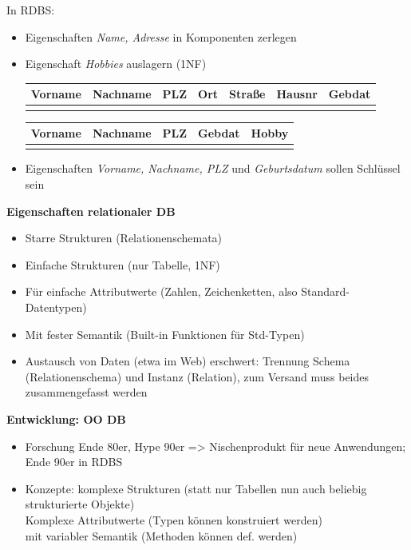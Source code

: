 In RDBS:
\begin{itemize}
	\item Eigenschaften \textit{Name, Adresse} in Komponenten zerlegen
	\item Eigenschaft \textit{Hobbies} auslagern (1NF)
	\begin{table}[!h]
		\centering
		\begin{tabular}{|l|l|l|l|l|l|l|}
			\hline
			Vorname & Nachname & PLZ & Ort & Straße & Hausnr & Gebdat\\
			\hline
			\hline
			&&&&&&\\
			\hline
		\end{tabular}
		\vspace{1cm}
		\begin{tabular}{|l|l|l|l|l|}
			\hline
			Vorname & Nachname & PLZ & Gebdat & Hobby\\
			\hline
			\hline
			&&&&\\
			\hline
		\end{tabular}
	\end{table}
	
	\item Eigenschaften \textit{Vorname, Nachname, PLZ} und \textit{Geburtsdatum} sollen Schlüssel sein
\end{itemize}

\textbf{Eigenschaften relationaler DB}
\begin{itemize}
	\item Starre Strukturen (Relationenschemata)
	\item Einfache Strukturen (nur Tabelle, 1NF)
	\item Für einfache Attributwerte (Zahlen, Zeichenketten, also Standard-Datentypen)
	\item Mit fester Semantik (Built-in Funktionen für Std-Typen)
	\item Austausch von Daten (etwa im Web) erschwert: Trennung Schema (Relationenschema) und Instanz (Relation), zum Versand muss beides zusammengefasst werden
\end{itemize}

\textbf{Entwicklung: OO DB}
\begin{itemize}
	\item Forschung Ende 80er, Hype 90er => Nischenprodukt für neue Anwendungen; Ende 90er in RDBS
	\item Konzepte: komplexe Strukturen (statt nur Tabellen nun auch beliebig strukturierte Objekte)\\
	Komplexe Attributwerte (Typen können konstruiert werden)\\
	mit variabler Semantik (Methoden können def. werden)
\end{itemize}

